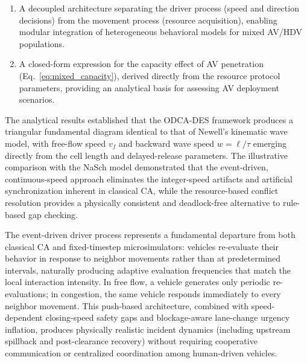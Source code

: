 \documentclass[review,authoryear]{elsarticle}
\begin{document}
\begin{enumerate}
    \item A decoupled architecture separating the driver process (speed and direction decisions) from the movement process (resource acquisition), enabling modular integration of heterogeneous behavioral models for mixed AV/HDV populations.

    \item A closed-form expression for the capacity effect of AV penetration (Eq.~\ref{eq:mixed_capacity}), derived directly from the resource protocol parameters, providing an analytical basis for assessing AV deployment scenarios.
\end{enumerate}

The analytical results established that the ODCA-DES framework produces a triangular fundamental diagram identical to that of Newell's kinematic wave model, with free-flow speed $v_f$ and backward wave speed $w = \ell/\tau$ emerging directly from the cell length and delayed-release parameters. The illustrative comparison with the NaSch model demonstrated that the event-driven, continuous-speed approach eliminates the integer-speed artifacts and artificial synchronization inherent in classical CA, while the resource-based conflict resolution provides a physically consistent and deadlock-free alternative to rule-based gap checking.

The event-driven driver process represents a fundamental departure from both classical CA and fixed-timestep microsimulators: vehicles re-evaluate their behavior in response to neighbor movements rather than at predetermined intervals, naturally producing adaptive evaluation frequencies that match the local interaction intensity. In free flow, a vehicle generates only periodic re-evaluations; in congestion, the same vehicle responds immediately to every neighbor movement. This push-based architecture, combined with speed-dependent closing-speed safety gaps and blockage-aware lane-change urgency inflation, produces physically realistic incident dynamics (including upstream spillback and post-clearance recovery) without requiring cooperative communication or centralized coordination among human-driven vehicles.
\end{document}
